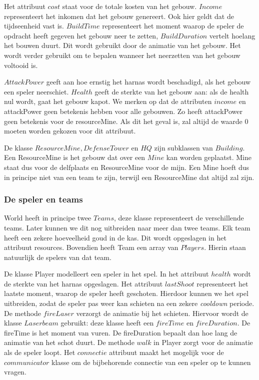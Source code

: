 \documentclass[a4paper,11pt, twoside]{article}
\begin{document}
Het attribuut $cost$ staat voor de totale kosten van het gebouw. $Income$ representeert het inkomen dat het gebouw genereert. Ook hier geldt dat de tijdseenheid vast is. $BuildTime$ representeert het moment waarop de speler de opdracht heeft gegeven het gebouw neer te zetten, $BuildDuration$ vertelt hoelang het bouwen duurt. Dit wordt gebruikt door de animatie van het gebouw. Het wordt verder gebruikt om te bepalen wanneer het neerzetten van het gebouw voltooid is.

$AttackPower$ geeft aan hoe ernstig het harnas wordt beschadigd, als het gebouw een speler neerschiet. $Health$ geeft de sterkte van het gebouw aan: als de health nul wordt, gaat het gebouw kapot. We merken op dat de attributen $income$ en attackPower geen betekenis hebben voor alle gebouwen. Zo heeft attackPower geen betekenis voor de resourceMine. Als dit het geval is, zal altijd de waarde 0 moeten worden gekozen voor dit attribuut.

De klasse $ResourceMine, DefenseTower$ en $HQ$ zijn subklassen van $Building$. Een ResourceMine is het gebouw dat over een $Mine$ kan worden geplaatst. Mine staat dus voor de delfplaats en ResourceMine voor de mijn. Een Mine hoeft dus in principe niet van een team te zijn, terwijl een ResourceMine dat altijd zal zijn.

\subsubsection{De speler en teams}
World heeft in principe twee $Teams$, deze klasse representeert de verschillende teams. Later kunnen we dit nog uitbreiden naar meer dan twee teams. Elk team heeft een zekere hoeveelheid goud in de kas. Dit wordt opgeslagen in het attribuut resources. Bovendien heeft Team een array van $Players$. Hierin staan natuurlijk de spelers van dat team.

De klasse Player modelleert een speler in het spel. In het attribuut $health$ wordt de sterkte van het harnas opgeslagen. Het attribuut $lastShoot$ representeert het laatste moment, waarop de speler heeft geschoten. Hierdoor kunnen we het spel uitbreiden, zodat de speler pas weer kan schieten na een zekere \emph{cooldown} periode. De methode $fireLaser$ verzorgt de animatie bij het schieten. Hiervoor wordt de klasse $Laserbeam$ gebruikt: deze klasse heeft een $fireTime$ en $fireDuration$. De fireTime is het moment van vuren. De fireDuration bepaalt dan hoe lang de animatie van het schot duurt. De methode $walk$ in Player zorgt voor de animatie als de speler loopt. Het $connectie$ attribuut maakt het mogelijk voor de $communicator$ klasse om de bijbehorende connectie van een speler op te kunnen vragen.
\end{document}
